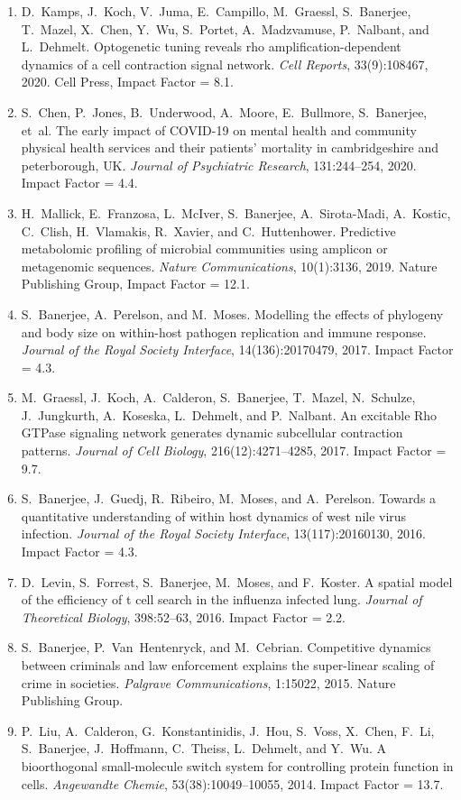 \documentclass[11pt,a4paper]{article}
\begin{document}
\begin{enumerate}
  \item D.~Kamps, J.~Koch, V.~Juma, E.~Campillo, M.~Graessl, S.~Banerjee, T.~Mazel, X.~Chen, Y.~Wu, S.~Portet, A.~Madzvamuse, P.~Nalbant, and L.~Dehmelt. Optogenetic tuning reveals rho amplification-dependent dynamics of a cell contraction signal network. {\em Cell Reports}, 33(9):108467, 2020. Cell Press, Impact Factor = 8.1.
  \item S.~Chen, P.~Jones, B.~Underwood, A.~Moore, E.~Bullmore, S.~Banerjee, et~al. The early impact of {COVID-19} on mental health and community physical health services and their patients' mortality in cambridgeshire and peterborough, {UK}. {\em Journal of Psychiatric Research}, 131:244--254, 2020. Impact Factor = 4.4.
  \item H.~Mallick, E.~Franzosa, L.~McIver, S.~Banerjee, A.~Sirota-Madi, A.~Kostic, C.~Clish, H.~Vlamakis, R.~Xavier, and C.~Huttenhower. Predictive metabolomic profiling of microbial communities using amplicon or metagenomic sequences. {\em Nature Communications}, 10(1):3136, 2019. Nature Publishing Group, Impact Factor = 12.1.
  \item S.~Banerjee, A.~Perelson, and M.~Moses. Modelling the effects of phylogeny and body size on within-host pathogen replication and immune response. {\em Journal of the Royal Society Interface}, 14(136):20170479, 2017. Impact Factor = 4.3.
  \item M.~Graessl, J.~Koch, A.~Calderon, S.~Banerjee, T.~Mazel, N.~Schulze, J.~Jungkurth, A.~Koseska, L.~Dehmelt, and P.~Nalbant. An excitable {Rho GTPase} signaling network generates dynamic subcellular contraction patterns. {\em Journal of Cell Biology}, 216(12):4271--4285, 2017. Impact Factor = 9.7.
  \item S.~Banerjee, J.~Guedj, R.~Ribeiro, M.~Moses, and A.~Perelson. Towards a quantitative understanding of within host dynamics of west nile virus infection. {\em Journal of the Royal Society Interface}, 13(117):20160130, 2016. Impact Factor = 4.3.
  \item D.~Levin, S.~Forrest, S.~Banerjee, M.~Moses, and F.~Koster. A spatial model of the efficiency of t cell search in the influenza infected lung. {\em Journal of Theoretical Biology}, 398:52--63, 2016. Impact Factor = 2.2.
  \item S.~Banerjee, P.~Van~Hentenryck, and M.~Cebrian. Competitive dynamics between criminals and law enforcement explains the super-linear scaling of crime in societies. {\em Palgrave Communications}, 1:15022, 2015. Nature Publishing Group.
  \item P.~Liu, A.~Calderon, G.~Konstantinidis, J.~Hou, S.~Voss, X.~Chen, F.~Li, S.~Banerjee, J.~Hoffmann, C.~Theiss, L.~Dehmelt, and Y.~Wu. A bioorthogonal small-molecule switch system for controlling protein function in cells. {\em Angewandte Chemie}, 53(38):10049--10055, 2014. Impact Factor = 13.7.

\end{enumerate}
\end{document}
